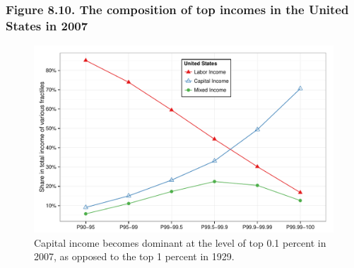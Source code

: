 \documentclass[t]{beamer}\usepackage[]{graphicx}\usepackage[]{color}
\newenvironment{knitrout}{}{} %
\begin{document}
\begin{frame}[label=Figure_8_10,fragile]
\frametitle{Figure 8.10. The composition of top incomes in the United States in 2007}
\begin{figure}[t]
\begin{minipage}[b]{\textwidth}
\centering
\begin{knitrout}\footnotesize
{}\color{fgcolor}

{\centering \includegraphics[width=1\linewidth]{figures/color/Figure_8_10} 

}



\end{knitrout}
\caption{Capital income becomes dominant at the level of top 0.1 percent in 2007, as opposed to the top 1 percent in 1929.}
\end{minipage}
\end{figure}
\end{frame}
\end{document}
